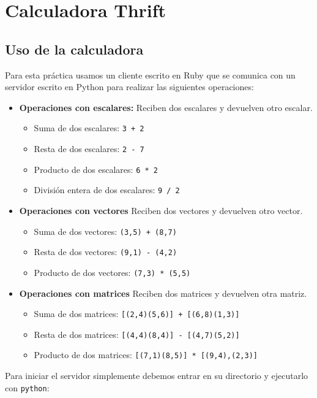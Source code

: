 \chapter{Calculadora Thrift}

\section{Uso de la calculadora}

Para esta práctica usamos un cliente escrito en Ruby que se comunica con un servidor escrito en Python para realizar las siguientes operaciones:

\begin{itemize}
	\item\textbf{Operaciones con escalares:}
		Reciben dos escalares y devuelven otro escalar.
		\begin{itemize}
			\item
				Suma de dos escalares: \texttt{3 + 2}
			\item
				Resta de dos escalares: \texttt{2 - 7}
			\item
				Producto de dos escalares: \texttt{6 * 2}
			\item
				División entera de dos escalares: \texttt{9 / 2}
		\end{itemize}
	\item\textbf{Operaciones con vectores}
		Reciben dos vectores y devuelven otro vector.
		\begin{itemize}
			\item
				Suma de dos vectores: \texttt{(3,5) + (8,7)}
			\item
				Resta de dos vectores: \texttt{(9,1) - (4,2)}
			\item
				Producto de dos vectores: \texttt{(7,3) * (5,5)}
		\end{itemize}
	\item\textbf{Operaciones con matrices}
		Reciben dos matrices y devuelven otra matriz.
		\begin{itemize}
			\item
				Suma de dos matrices: \texttt{[(2,4)(5,6)] + [(6,8)(1,3)]}
			\item
				Resta de dos matrices: \texttt{[(4,4)(8,4)] - [(4,7)(5,2)]}
			\item
				Producto de dos matrices: \texttt{[(7,1)(8,5)] * [(9,4),(2,3)]}
		\end{itemize}
\end{itemize}

Para iniciar el servidor simplemente debemos entrar en su directorio y ejecutarlo con \texttt{python}:

